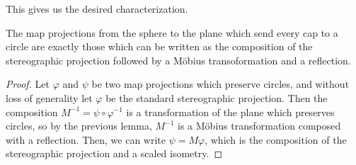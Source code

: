 This gives us the desired characterization.
\begin{theorem}\label{thm:stereographic_mobius}
  The map projections from the sphere to the plane which send every
  cap to a circle are exactly those which can be written as the
  composition of the stereographic projection followed by a 
  M\"{o}bius transoformation and a reflection.
\end{theorem}
\begin{proof}
  Let $\varphi$ and $\psi$ be two map projections which preserve
  circles, and without loss of generality let $\varphi$ be the
  standard stereographic projection.  Then the composition
  $M^{-1}=\psi\circ\varphi^{-1}$ is a transformation of 
  the plane which preserves circles, so by the previous lemma, 
  $M^{-1}$ is a M\"{o}bius transformation composed with a reflection. 
  Then, we can write $\psi= M\varphi$, which is the
  composition of the stereographic projection and a scaled isometry.
\end{proof}

